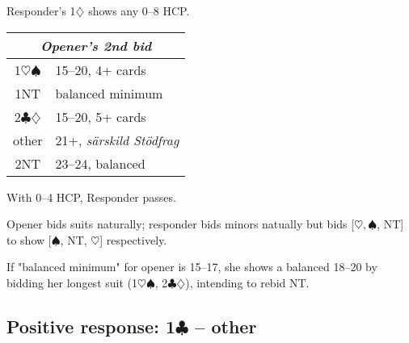 \documentclass[a4paper, twoside, 11pt]{article}
\begin{document}
\begin{multicols}{3}
Responder's 1$\diamondsuit$ shows any 0--8 HCP.

\begin{center}
\begin{tabular}{ |c|l| }
 \hline
 \multicolumn{2}{|c|}{\textit{Opener's 2nd bid}} \\
 \hline
 1$\heartsuit\spadesuit$ & 15--20, 4+ cards\\
 1NT& balanced minimum \\
 2$\clubsuit\diamondsuit$ & 15--20, 5+ cards\\
 other& 21+, \textit{särskild Stödfrag}\\
 2NT& 23--24, balanced\\

 \hline
\end{tabular}
\end{center}

With 0--4 HCP, Responder passes.

Opener bids suits naturally; responder bids minors natually but bids [$\heartsuit, \spadesuit$, NT] to show [$\spadesuit$, NT, $\heartsuit$] respectively.

If "balanced minimum" for opener is 15--17, she shows a balanced 18--20 by bidding her longest suit (1$\heartsuit\spadesuit$, 2$\clubsuit\diamondsuit$), intending to rebid NT.\\





\subsection*{Positive response: 1$\clubsuit$ -- other}


\end{multicols}
\end{document}
